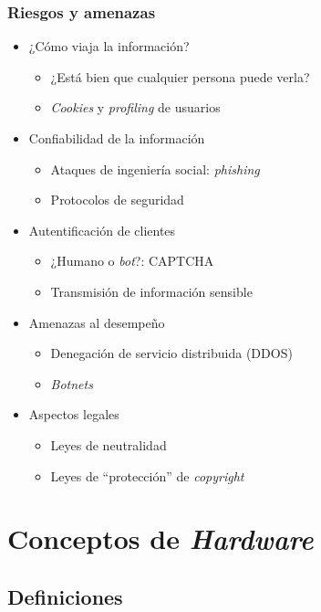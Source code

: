 \documentclass[letter]{beamer}
\begin{document}
\begin{frame}
  \frametitle{Riesgos y amenazas}

  \begin{itemize}
    \item ¿Cómo viaja la información?
      \begin{itemize}
        \item ¿Está bien que cualquier persona puede verla?
        \item {\em Cookies} y {\em profiling} de usuarios
      \end{itemize}
    \item Confiabilidad de la información
      \begin{itemize}
        \item Ataques de ingeniería social: {\em phishing}
        \item Protocolos de seguridad
      \end{itemize}
    \item Autentificación de clientes
      \begin{itemize}
        \item ¿Humano o {\em bot}?: CAPTCHA
        \item Transmisión de información sensible
      \end{itemize}
    \item Amenazas al desempeño
      \begin{itemize}
        \item Denegación de servicio distribuida (DDOS)
        \item {\em Botnets}
      \end{itemize}
    \item Aspectos legales
      \begin{itemize}
        \item Leyes de neutralidad
        \item Leyes de ``protección'' de {\em copyright}
      \end{itemize}
  \end{itemize}
  
\end{frame}
\section{Conceptos de {\em Hardware}}

\subsection{Definiciones}
\end{document}
